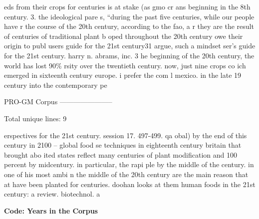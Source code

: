 \begin{footnotesize}
eds from their crops for centuries is at stake (as gmo cr\newline
ans beginning in the 8th century. 3. the ideological pare\newline
s, “during the past five centuries, while our people have\newline
r the course of the 20th century, according to the fao, a\newline
r they are the result of centuries of traditional plant b\newline
oped throughout the 20th century owe their origin to publ\newline
users guide for the 21st century31 argue, such a mindset \newline
ser’s guide for the 21st century. harry n. abrams, inc. 3\newline
he beginning of the 20th century, the world has lost 90\%\newline
rsity over the twentieth century. now, just nine crops co\newline
ich emerged in sixteenth century europe. i prefer the com\newline
l mexico. in the late 19 century into the contemporary pe

PRO-GM Corpus\newline
-----------------------

Total unique lines: 9

erspectives for the 21st century. session 17. 497-499. qa\newline
obal) by the end of this century in 2100 – global food se\newline
techniques in eighteenth century britain that brought abo\newline
ited states reflect many centuries of plant modification  and 100 percent by midcentury. in particular, the rapi\newline
ple by the middle of the century. in one of his most ambi\newline
n the middle of the 20th century are the main reason that\newline
at have been planted for centuries. doohan looks at them \newline
 human foods in the 21st century: a review. biotechnol. a
\end{footnotesize}

\textbf{Code: Years in the Corpus}

